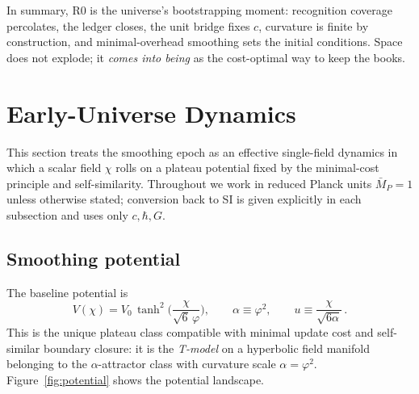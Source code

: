 \documentclass[11pt]{article}
\theoremstyle{definition}
\theoremstyle{remark}
\begin{document}
In summary, R0 is the universe’s bootstrapping moment: recognition coverage percolates, the ledger closes, the unit bridge fixes \(c\), curvature is finite by construction, and minimal-overhead smoothing sets the initial conditions. Space does not explode; it \emph{comes into being} as the cost-optimal way to keep the books.

\section{Early-Universe Dynamics}
This section treats the smoothing epoch as an effective single-field dynamics in which a scalar field \(\chi\) rolls on a plateau potential fixed by the minimal-cost principle and self-similarity. Throughout we work in reduced Planck units \(\bar M_{\!P}=1\) unless otherwise stated; conversion back to SI is given explicitly in each subsection and uses only \(c,\hbar,G\).

\subsection{Smoothing potential}
The baseline potential is
\begin{equation}
  V(\chi)=V_0\,\tanh^2\!\Big(\frac{\chi}{\sqrt{6}\,\varphi}\Big), 
  \qquad \alpha\equiv\varphi^2,
  \qquad u\equiv \frac{\chi}{\sqrt{6\alpha}} \, .
  \label{eq:V}
\end{equation}
This is the unique plateau class compatible with minimal update cost and self-similar boundary closure: it is the \emph{T-model} on a hyperbolic field manifold belonging to the \(\alpha\)-attractor class \citep{KalloshLinde2013} with curvature scale \(\alpha=\varphi^2\). Figure~\ref{fig:potential} shows the potential landscape.
\end{document}
